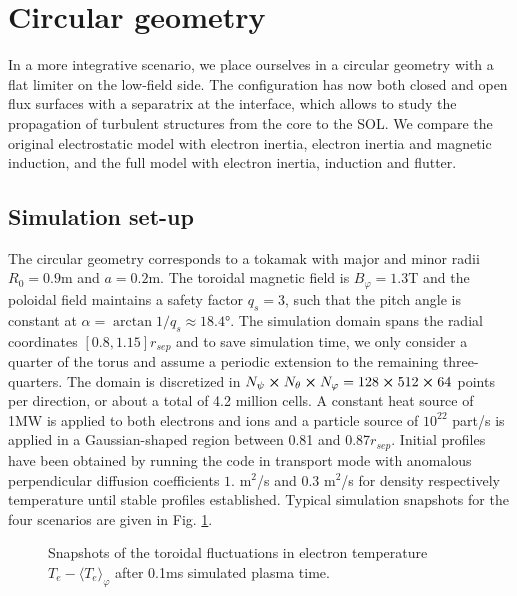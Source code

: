 \section{Circular geometry}
\label{sec:anal_CIRC}

In a more integrative scenario, we place ourselves in a circular geometry with a flat limiter on the low-field side. The configuration has now both closed and open flux surfaces with a separatrix at the interface, which allows to study the propagation of turbulent structures from the core to the SOL. We compare the original electrostatic model with electron inertia, electron inertia and magnetic induction, and the full model with electron inertia, induction and flutter.

\subsection{Simulation set-up}

The circular geometry corresponds to a tokamak with major and minor radii $R_0 = 0.9$m and $a=0.2$m. The toroidal magnetic field is $B_\varphi = 1.3$T and the poloidal field maintains a safety factor $q_s=3$, such that the pitch angle is constant at $\alpha = \arctan1/q_s \approx 18.4°$. The simulation domain spans the radial coordinates $[0.8,1.15]r_{sep}$ and to save simulation time, we only consider a quarter of the torus and assume a periodic extension to the remaining three-quarters. The domain is discretized in $N_\psi\cross N_\theta \cross N_\varphi = 128\cross512\cross64$ points per direction, or about a total of 4.2 million cells. A constant heat source of 1MW is applied to both electrons and ions and a particle source of $10^{22}$ part/s is applied in a Gaussian-shaped region between 0.81 and 0.87$r_{sep}$. Initial profiles have been obtained by running the code in transport mode with anomalous perpendicular diffusion coefficients $1.$ m$^2$/s and $0.3$ m$^2$/s for density respectively temperature until stable profiles established. Typical simulation snapshots for the four scenarios are given in Fig. \ref{fig:anal_CIRC_fluctT}.

\begin{figure}[H]\centering
	\centering
	\caption[Snapshots of the toroidal fluctuations in electron temperature $T_e - \langle T_e\rangle_\varphi$ after 0.1ms simulated plasma time]{Snapshots of the toroidal fluctuations in electron temperature $T_e - \langle T_e\rangle_\varphi$ after 0.1ms simulated plasma time.}
	\label{fig:anal_CIRC_fluctT}
\end{figure}


